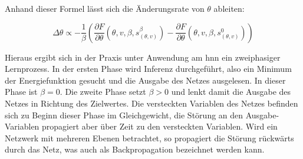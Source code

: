 Anhand dieser Formel lässt sich die Änderungsrate von \(\theta\) ableiten:

\[\Delta\theta\propto -\frac{1}{\beta}\left(\frac{\partial F}{\partial \theta}(\theta,v,\beta,s_{(\theta,v)}^\beta)-\frac{\partial F}{\partial \theta}(\theta,v,\beta,s_{(\theta,v)}^0)\right)\]

Hieraus ergibt sich in der Praxis unter Anwendung am \ac{hnn} ein zweiphasiger Lernprozess. In der ersten Phase wird Inferenz durchgeführt, also ein Minimum der Energiefunktion gesucht und die Ausgabe des Netzes ausgelesen. In dieser Phase ist \(\beta=0\). Die zweite Phase setzt \(\beta>0\) und lenkt damit die Ausgabe des Netzes in Richtung des Zielwertes. Die versteckten Variablen des Netzes befinden sich zu Beginn dieser Phase im Gleichgewicht, die Störung an den Ausgabe-Variablen propagiert aber über Zeit zu den versteckten Variablen. Wird ein Netzwerk mit mehreren Ebenen betrachtet, so propagiert die Störung rückwärts durch das Netz, was auch als Backpropagation bezeichnet werden kann. \cite{Scellier2017}
